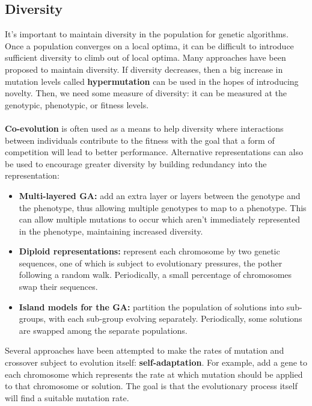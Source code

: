 \documentclass[a4paper,11pt]{article}
\begin{document}
\subsection{Diversity}
It's important to maintain diversity in the population for genetic algorithms.
Once a population converges on a local optima, it can be difficult to introduce sufficient diversity to climb out of local optima.
Many approaches have been proposed to maintain diversity.
If diversity decreases, then a big increase in mutation levels called \textbf{hypermutation} can be used in the hopes of introducing novelty.
Then, we need some measure of diversity: it can be measured at the genotypic, phenotypic, or fitness levels.
\\\\
\textbf{Co-evolution} is often used as a means to help diversity where interactions between individuals contribute to the fitness with the goal that a form of competition will lead to better performance.
Alternative representations can also be used to encourage greater diversity by building redundancy into the representation:
\begin{itemize}
    \item   \textbf{Multi-layered GA:} add an extra layer or layers between the genotype and the phenotype, thus allowing multiple genotypes to map to a phenotype.
            This can allow multiple mutations to occur which aren't immediately represented in the phenotype, maintaining increased diversity.

    \item   \textbf{Diploid representations:} represent each chromosome by two genetic sequences, one of which is subject to evolutionary pressures, the pother following a random walk.
            Periodically, a small percentage of chromosomes swap their sequences.

    \item   \textbf{Island models for the GA:} partition the population of solutions into sub-groups, with each sub-group evolving separately.
            Periodically, some solutions are swapped among the separate populations.
\end{itemize}

Several approaches have been attempted to make the rates of mutation and crossover subject to evolution itself: \textbf{self-adaptation}.
For example, add a gene to each chromosome which represents the rate at which mutation should be applied to that chromosome or solution.
The goal is that the evolutionary process itself will find a suitable mutation rate.
\end{document}
